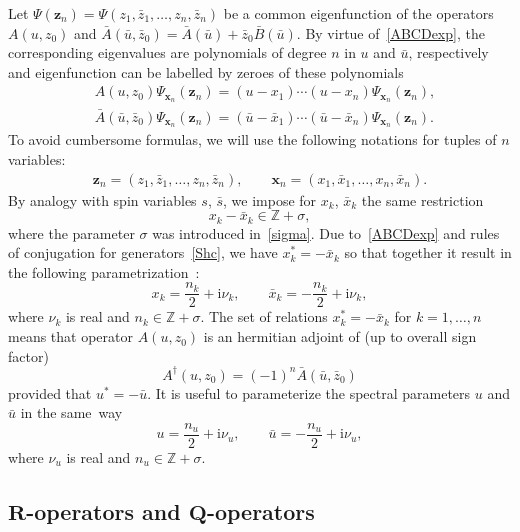 \documentclass[pdftex]{sigma}
\renewcommand{\imath}{\mathrm{i}}
\numberwithin{equation}{section}
\begin{document}
Let $\Psi(\bm z_n) = \Psi(z_1,\bar z_1,\dots, z_n,\bar z_n)$
be a common eigenfunction of the operators
$A(u,z_0)$ and $\bar{A}(\bar{u},\bar{z}_0) = \bar{A}(\bar{u})+\bar{z}_0 \bar{B}(\bar{u})$.
By virtue of~\eqref{ABCDexp}, the corresponding eigenvalues are
polynomials of degree $n$ in $u$ and $\bar u$, respectively and
eigenfunction can be labelled by zeroes of these polynomials
\begin{align}
&A(u,z_0)
\Psi_{\bm x_n }(\bm z_n)= (u-x_1)\cdots(u-x_n)
\Psi_{\bm x_n }(\bm z_n),
\nonumber\\
&\bar{A}(\bar{u},\bar{z}_0) \Psi_{\bm x_n }(\bm z_n)=
(\bar u-\bar x_1)\cdots(\bar u-\bar x_n)
\Psi_{\bm x_n }(\bm z_n).\label{AbAN}
\end{align}
To avoid cumbersome formulas, we will use the following
notations for tuples of $n$ variables:
\begin{align*}
\bm z_n=(z_1,\bar{z}_1, \dots, z_n, \bar{z}_n) , \qquad
\bm x_n=(x_1,\bar{x}_1, \dots, x_n, \bar{x}_n).
\end{align*}
By analogy with spin variables $s$, $\bar{s}$, we
impose for $x_k$, $\bar x_k$ the same restriction
\begin{equation*}
x_k-\bar x_k \in \mathbb{Z}+\sigma,
\end{equation*}
where the parameter $\sigma$ was introduced in~\eqref{sigma}.
Due to~\eqref{ABCDexp} and rules of conjugation for generators~\eqref{Shc}, we have $x_k^*=-\bar{x}_k$ so that together it result
in the following parametrization~\cite{DKM}:%
\begin{equation}\label{x-n-nu}
x_k=\frac{n_k}{2}+\imath\nu_k,\qquad \bar x_k=-\frac{n_k}{2}+\imath\nu_k ,
\end{equation}
where $\nu_k$ is real and $n_k \in \mathbb{Z}+\sigma$.
The set of relations $x_k^*=-\bar{x}_k$ for $k=1 ,\dots , n $
means that operator $A(u,z_0)$ is an hermitian adjoint
of  (up to overall sign factor)
\begin{equation*}
A^\dagger(u,z_0) = (-1)^n \bar A(\bar u, \bar{z}_0)
\end{equation*}
provided that $u^*=-\bar u$. It is useful to
parameterize the spectral parameters $u$ and $\bar{u}$ in the same~way
\begin{equation*}
u=\frac{n_u}{2}+\imath\nu_u,\qquad \bar u = -\frac{n_u}{2}+\imath\nu_u ,
\end{equation*}
where $\nu_u$ is real and $n_u \in \mathbb{Z}+\sigma$.

\subsection[R-operators and Q-operators]{$\boldsymbol{R}$-operators and $\boldsymbol{Q}$-operators}%
\end{document}
